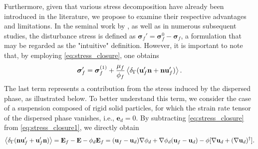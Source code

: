 Furthermore, given that various stress decomposition have already been introduced in the literature, we propose to examine their respective advantages and limitations. 
In the seminal work by \citet{zhang1997momentum}, as well as in numerous subsequent studies, the disturbance stress is defined as $\bm\sigma_f' = \bm\sigma_f^0 - \bm\sigma_f$, a formulation that may be regarded as the "intuitive" definition. 
However, it is important to note that, by employing \ref{eq:stress_closure}, one obtains
\begin{equation}
    \bm\sigma_f'
    = \bm \sigma _f ^{(1)}
    + \frac{\mu_f}{\phi_f} \avg{\delta_\Gamma( \textbf{u}_f'  \textbf{n} +  \textbf{n} \textbf{u}_f' )}.
    \label{eq:stress_closure_zhang}
\end{equation}
The last term represents a contribution from the stress induced by the dispersed phase, as illustrated below. 
To better understand this term, we consider the case of a suspension composed of rigid solid particles, for which the strain rate tensor of the dispersed phase vanishes, i.e., $\textbf{e}_d = 0$.
By subtracting \ref{eq:stress_closure} from \ref{eq:stress_closure1}, we directly obtain
\begin{equation}
    \left<\delta_\Gamma (\textbf{n} \textbf{u}_f'+  \textbf{u}_f' \textbf{n})\right>
    = \textbf{E}_f - \textbf{E}
    - \phi_d \textbf{E}_f 
    =
    (\textbf{u}_f - \textbf{u}_d)\mathbf{\nabla} \phi_d + \mathbf{\nabla} \phi_d (\textbf{u}_f - \textbf{u}_d)   
    -  \phi [\mathbf{\nabla} \textbf{u}_d+ (\mathbf{\nabla} \textbf{u}_d)^\dagger ]. 
\end{equation} 
